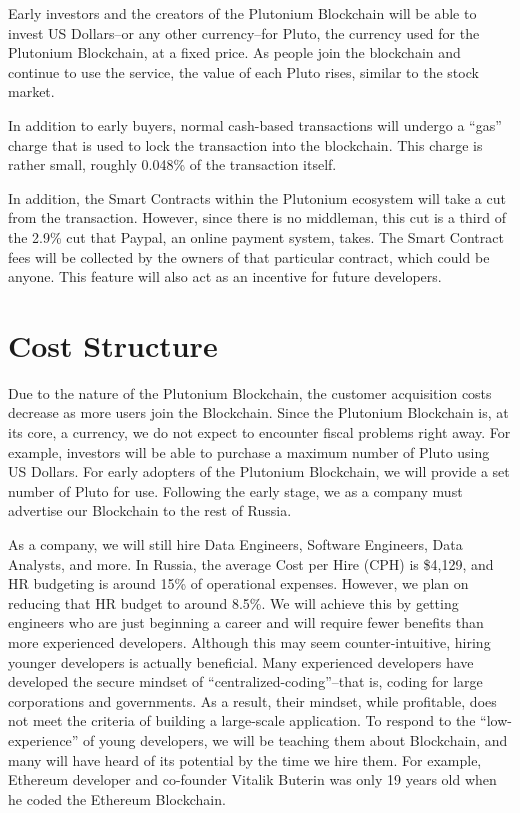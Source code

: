 \documentclass[12pt]{article}
\begin{document}
Early investors and the creators of the Plutonium Blockchain will be able to invest US Dollars--or any other currency--for Pluto, the currency used for the Plutonium Blockchain, at a fixed price. As people join the blockchain and continue to use the service, the value of each Pluto rises, similar to the stock market.

In addition to early buyers, normal cash-based transactions will undergo a ``gas'' charge that is used to lock the transaction into the blockchain. This charge is rather small, roughly 0.048\% of the transaction itself.

In addition, the Smart Contracts within the Plutonium ecosystem will take a cut from the transaction. However, since there is no middleman, this cut is a third of the 2.9\% cut that Paypal, an online payment system, takes. The Smart Contract fees will be collected by the owners of that particular contract, which could be anyone. This feature will also act as an incentive for future developers.
\pagebreak
\section{Cost Structure}
Due to the nature of the Plutonium Blockchain, the customer acquisition costs decrease as more users join the Blockchain. Since the Plutonium Blockchain is, at its core, a currency, we do not expect to encounter fiscal problems right away. For example, investors will be able to purchase a maximum number of Pluto using US Dollars. For early adopters of the Plutonium Blockchain, we will provide a set number of Pluto for use. Following the early stage, we as a company must advertise our Blockchain to the rest of Russia.

As a company, we will still hire Data Engineers, Software Engineers, Data Analysts, and more. In Russia, the average Cost per Hire (CPH) is \$4,129, and HR budgeting is around 15\% of operational expenses. However, we plan on reducing that HR budget to around 8.5\%. We will achieve this by getting engineers who are just beginning a career and will require fewer benefits than more experienced developers. Although this may seem counter-intuitive, hiring younger developers is actually beneficial. Many experienced developers have developed the secure mindset of ``centralized-coding''--that is, coding for large corporations and governments. As a result, their mindset, while profitable, does not meet the criteria of building a large-scale application. To respond to the ``low-experience'' of young developers, we will be teaching them about Blockchain, and many will have heard of its potential by the time we hire them. For example, Ethereum developer and co-founder Vitalik Buterin was only 19 years old when he coded the Ethereum Blockchain.
\pagebreak
\end{document}
